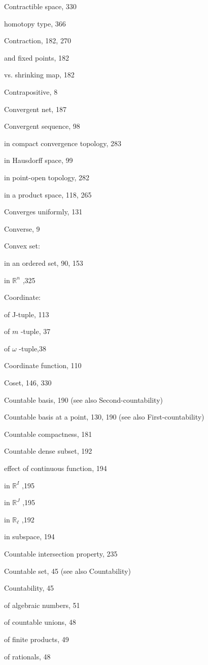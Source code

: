 Contractible space, 330

homotopy type, 366

Contraction, 182, 270

and fixed points, 182

vs. shrinking map, 182

Contrapositive, 8

Convergent net, 187

Convergent sequence, 98

in compact convergence topology, 283

in Hausdorff space, 99

in point-open topology, 282

in a product space, 118, 265

Converges uniformly, 131

Converse, 9

Convex set:

in an ordered set, 90, 153

in \({\mathbb{R}}^{n}\) ,325

Coordinate:

of J-tuple, 113

of \(m\) -tuple, 37

of \(\omega\) -tuple,38

Coordinate function, 110

Coset, 146, 330

Countable basis, 190 (see also Second-countability)

Countable basis at a point, 130, 190 (see also First-countability)

Countable compactness, 181

Countable dense subset, 192

effect of continuous function, 194

in \({\mathbb{R}}^{I}\) ,195

in \({\mathbb{R}}^{J}\) ,195

in \({\mathbb{R}}_{\ell }\) ,192

in subspace, 194

Countable intersection property, 235

Countable set, 45 (see also Countability)

Countability, 45

of algebraic numbers, 51

of countable unions, 48

of finite products, 49

of rationals, 48

